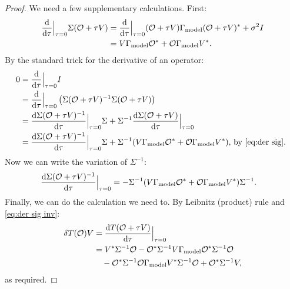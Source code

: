 \documentclass{amsart}
\numberwithin{equation}{section}
\begin{document}
\begin{proof}
  We need a few supplementary calculations. First:
  \begin{align}\label{eq:der sig}
    \begin{split}
      \frac{\text{\textup{d}}}{\text{\textup{d}} \tau} \Big |_{\tau=0} \Sigma( \mathcal{O} + \tau V )
      &= \frac{\text{\textup{d}}}{\text{\textup{d}} \tau} \Big |_{\tau=0} 
      (\mathcal{O} + \tau V ) \Gamma_{\textup{model}} (\mathcal{O} + \tau V )^*  + \sigma^2I\\
      &= V \Gamma_{\textup{model}} \mathcal{O}^* + \mathcal{O} \Gamma_{\textup{model}} V^*.
    \end{split}
  \end{align}
  By the standard trick for the derivative of an operator: 
  \begin{align*}
    0 &= \frac{\text{\textup{d}}}{\text{\textup{d}} \tau} \Big |_{\tau=0} I \\
    &= \frac{\text{\textup{d}}}{\text{\textup{d}} \tau} \Big |_{\tau=0}
    \left (\Sigma(\mathcal{O}+\tau V)^{-1} \Sigma(\mathcal{O}+\tau V) \right ) \\
    &= \frac{\text{\textup{d}} \Sigma(\mathcal{O}+\tau V)^{-1}}{\text{\textup{d}} \tau} \Big |_{\tau=0} \Sigma+
    \Sigma^{-1} \frac{\text{\textup{d}} \Sigma(\mathcal{O}+\tau V)}{\text{\textup{d}} \tau} \Big |_{\tau=0}\\  
    &= \frac{\text{\textup{d}} \Sigma(\mathcal{O}+\tau V)^{-1}}{\text{\textup{d}} \tau} \Big |_{\tau=0} \Sigma+
    \Sigma^{-1} (V\Gamma_{\textup{model}} \mathcal{O}^* + \mathcal{O} \Gamma_{\textup{model}} V^*) 
    \text{, by \eqref{eq:der sig}. }
  \end{align*}
  Now we can write the variation of $\Sigma^{-1}$:
  \begin{align}\label{eq:der sig inv}
    \frac{\text{\textup{d}} \Sigma(\mathcal{O}+\tau V)^{-1}}{\text{\textup{d}} \tau} \Big |_{\tau=0}  
      &= -\Sigma^{-1} (V \Gamma_{\textup{model}} \mathcal{O}^* + \mathcal{O} \Gamma_{\textup{model}} V^*) \Sigma^{-1}.
    \end{align}
  Finally, we can do the calculation we need to. By Leibnitz (product) rule
  and \eqref{eq:der sig inv}:
  \begin{align*}
    \delta T(\mathcal{O}) V 
    &= \frac{\text{\textup{d}} T(\mathcal{O} + \tau V)}{\text{\textup{d}} \tau} \Big |_{\tau=0} \\
    &= V^* \Sigma^{-1} \mathcal{O} 
    - \mathcal{O}^*\Sigma^{-1} V\Gamma_{\textup{model}} \mathcal{O}^* \Sigma^{-1}\mathcal{O} \\
    &\ \ \ - \mathcal{O}^* \Sigma^{-1} \mathcal{O} \Gamma_{\textup{model}} V^* \Sigma^{-1}\mathcal{O}
    + \mathcal{O}^* \Sigma^{-1} V,
  \end{align*}
  as required.
\end{proof}
\end{document}
